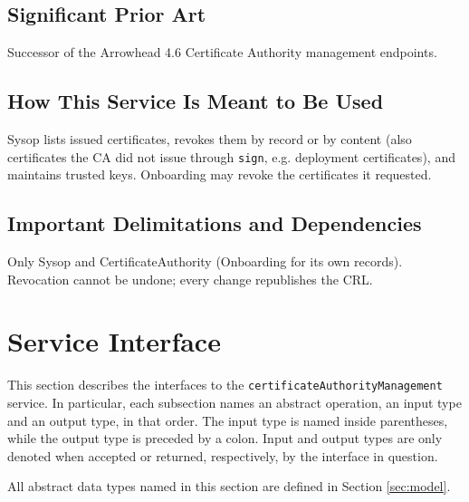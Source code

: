 \documentclass[a4paper]{arrowhead}
\begin{document}
\subsection{Significant Prior Art}

Successor of the Arrowhead 4.6 Certificate Authority management endpoints.

\subsection{How This Service Is Meant to Be Used}

Sysop lists issued certificates, revokes them by record or by content (also certificates the CA did not issue through \texttt{sign}, e.g. deployment certificates), and maintains trusted keys. Onboarding may revoke the certificates it requested.

\subsection{Important Delimitations and Dependencies}
\label{sec:delimitations}

Only Sysop and Certificate\allowbreak{}Authority (Onboarding for its own records). Revocation cannot be undone; every change republishes the CRL.

\newpage

\section{Service Interface}
\label{sec:operations}

This section describes the interfaces to the \texttt{certificate\allowbreak{}Authority\allowbreak{}Management} service.
In particular, each subsection names an abstract operation, an input type and an output type, in that order.
The input type is named inside parentheses, while the output type is preceded by a colon.
Input and output types are only denoted when accepted or returned, respectively, by the interface in question.

All abstract data types named in this section are defined in Section \ref{sec:model}.
\end{document}
